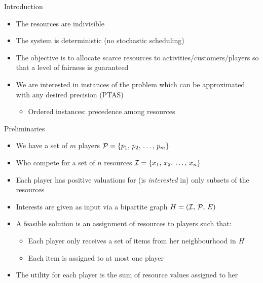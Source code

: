 \documentclass[10pt]{beamer}
\begin{document}
\begin{frame}{Introduction}
	\begin{itemize}
    	\item<1-> The resources are indivisible
        \item<2-> The system is deterministic (no stochastic scheduling)
        \item<3-> The objective is to allocate scarce resources to activities/customers/players so that a level of \alert{fairness} is guaranteed
    	\item<4-> We are interested in instances of the problem which can be approximated with any desired precision (PTAS)
		\begin{itemize}
        	\item<5-> \alert{Ordered instances}: precedence among resources
        \end{itemize}
    \end{itemize}

\end{frame}

\begin{frame}{Preliminaries}
	\begin{itemize}
    	\item<1-> We have a set of $m$ players $\mathcal{P} = \{p_1, \, p_2, \, \ldots, \, p_m  \}$
        \item<2-> Who compete for a set of $n$ resources $\mathcal{I} = \{x_1, \, x_2, \, \ldots, \, x_n \}$
        \item<3-> Each player has positive valuations for (is \emph{interested} in) only subsets of the resources
        \item<4-> Interests are given as input via a bipartite graph $H = (\mathcal{I}, \, \mathcal{P}, \, E)$
        \item<5-> A \alert{feasible} solution is an assignment of resources to players such that:
        \begin{itemize}
         	\item<6-> Each player only receives a set of items from her neighbourhood in $H$
            \item<7-> Each item is assigned to at most one player
        \end{itemize}
        \item<8-> The utility for each player is the sum of resource values assigned to her
    \end{itemize}
\end{frame}
\end{document}
